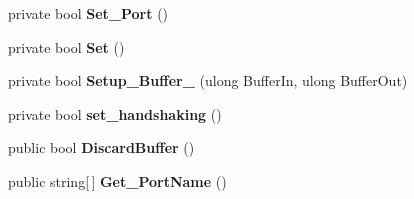 \begin{DoxyCompactItemize}
\item 
\hypertarget{namespaceedwinspire_1_1_ports_a17877b618445a0e65f46c94bc80bc821}{private bool {\bfseries Set\-\_\-\-Port} ()}\label{namespaceedwinspire_1_1_ports_a17877b618445a0e65f46c94bc80bc821}

\item 
\hypertarget{namespaceedwinspire_1_1_ports_ab4f5440159397421d6f1985dccda8aa7}{private bool {\bfseries Set} ()}\label{namespaceedwinspire_1_1_ports_ab4f5440159397421d6f1985dccda8aa7}

\item 
\hypertarget{namespaceedwinspire_1_1_ports_a7a08c939ddf6ae7e1426b3bd061c3f13}{private bool {\bfseries Setup\-\_\-\-Buffer\-\_\-} (ulong Buffer\-In, ulong Buffer\-Out)}\label{namespaceedwinspire_1_1_ports_a7a08c939ddf6ae7e1426b3bd061c3f13}

\item 
\hypertarget{namespaceedwinspire_1_1_ports_a16c386569d50ef1f47b43bce24c54cde}{private bool {\bfseries set\-\_\-handshaking} ()}\label{namespaceedwinspire_1_1_ports_a16c386569d50ef1f47b43bce24c54cde}

\item 
\hypertarget{namespaceedwinspire_1_1_ports_ae3a4888c33e46ef2cb9c21475b39747d}{public bool {\bfseries Discard\-Buffer} ()}\label{namespaceedwinspire_1_1_ports_ae3a4888c33e46ef2cb9c21475b39747d}

\item 
\hypertarget{namespaceedwinspire_1_1_ports_ab6cd9fa85820a8013aa6f47c89eb8102}{public string\mbox{[}$\,$\mbox{]} {\bfseries Get\-\_\-\-Port\-Name} ()}\label{namespaceedwinspire_1_1_ports_ab6cd9fa85820a8013aa6f47c89eb8102}

\end{DoxyCompactItemize}
